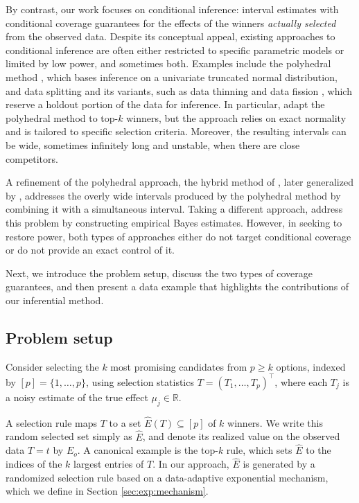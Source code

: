 \documentclass[12pt]{article}
\begin{document}
By contrast, our work focuses on conditional inference: interval estimates with
conditional coverage guarantees for the effects of the winners
\emph{actually selected} from the observed data. 
Despite its conceptual appeal, existing approaches to conditional inference are often either restricted to specific parametric models or limited by low power, and sometimes both.
Examples include the polyhedral method \citep{Lee_2016}, which bases inference on a univariate truncated normal distribution, and data splitting and its variants, such as data thinning and data fission \citep{rasines2023splitting, dharamshi2025generalized, leiner2025data}, which reserve a holdout portion of the data for inference.
In particular, \citet{reid2017post} adapt the polyhedral method to top-$k$ winners, but the approach relies on exact normality and is tailored to specific selection criteria.
Moreover, the resulting intervals can be wide, sometimes infinitely long and unstable, when there are close competitors.

A refinement of the polyhedral approach, the hybrid method of \citet{andrews2024inference}, later generalized by \citet{mccloskey2024hybrid},  addresses the overly wide intervals produced by the polyhedral method by combining it with a simultaneous interval.
Taking a different approach, \citet{hoff2025selective} address this problem by constructing empirical Bayes estimates.
However, in seeking to restore power, both types of approaches either do not target conditional coverage or do not provide an exact control of it.

Next, we introduce the problem setup, discuss the two types of coverage guarantees, and then present a data example that highlights the contributions of our inferential method.


\subsection{Problem setup}
\label{sec:setup}


Consider selecting the $k$ most promising candidates from $p\geq k$ options,
indexed by $[p]=\{1,\ldots,p\}$, using selection statistics
$T=(T_1,\ldots,T_p)^\top$, where each $T_j$ is a noisy estimate of the true
effect $\mu_j\in\mathbb{R}$. 

A selection rule maps $T$ to a set $\widehat E(T)\subseteq[p]$ of $k$ winners.
We write this random selected set simply as $\widehat E$, and denote its realized value on the observed data $T=t$ by $E_o$.
A canonical example is the top-$k$ rule, which sets $\widehat E$ to the indices
of the $k$ largest entries of $T$. 
In our approach, $\widehat E$ is generated by a randomized selection rule based on a data-adaptive exponential mechanism, which we define in Section \ref{sec:exp:mechanism}.
\end{document}
